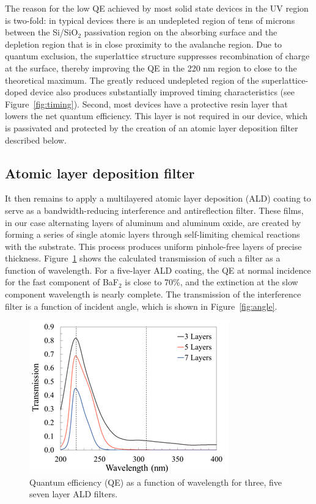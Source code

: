 The reason for the low QE achieved by most solid state devices in the UV region is two-fold: in typical devices there is an undepleted region of tens of microns between the Si/SiO$_2$ passivation region on the absorbing surface and the depletion region that is in close proximity to the avalanche region.
Due to quantum exclusion, the superlattice structure suppresses recombination of charge at the surface, thereby improving the QE in the 220 nm region to close to the theoretical maximum. The greatly reduced undepleted region of the superlattice-doped device also produces substantially improved timing characteristics (see Figure~\ref{fig:timing}). Second, most devices have a protective resin layer that lowers the net quantum efficiency. This layer is not required in our device, which is passivated and protected by the creation of an atomic layer deposition filter described below.

\subsection{Atomic layer deposition filter}

It then remains to apply a multilayered atomic layer deposition (ALD) coating to serve as a bandwidth-reducing interference and antireflection filter.  These films, in our case alternating layers of aluminum and aluminum oxide, are created by forming a series of single atomic layers through self-limiting chemical reactions with the substrate. This process produces uniform pinhole-free layers of precise thickness. Figure~\ref{fig:filter} shows the calculated transmission of such a filter as a function of wavelength. For a five-layer ALD coating, the QE at normal incidence for the fast component of BaF$_2$ is close to 70\%, and the extinction at the slow component wavelength is nearly complete. The transmission of the interference filter is a function of incident angle, which is shown in Figure~\ref{fig:angle}.



\begin{figure}[h!]
\centering
\includegraphics[width=0.9\linewidth]{Figures/filter1.png}
\caption{Quantum efficiency (QE) as a function of wavelength for  three, five seven layer ALD filters. }
\label{fig:filter}
\end{figure}

